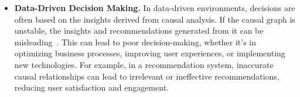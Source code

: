 \begin{itemize}
    \item \textbf{Data-Driven Decision Making.} In data-driven environments, decisions are often based on the insights derived from causal analysis. If the causal graph is unstable, the insights and recommendations generated from it can be misleading~\cite{10.1145/3636423}. This can lead to poor decision-making, whether it's in optimizing business processes, improving user experiences, or implementing new technologies. For example, in a recommendation system, inaccurate causal relationships can lead to irrelevant or ineffective recommendations, reducing user satisfaction and engagement.

\end{itemize}





